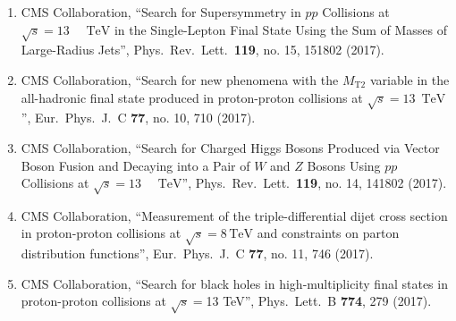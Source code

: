 \begin{enumerate}
\item CMS Collaboration, ``Search for Supersymmetry in $pp$ Collisions at $\sqrt{s}=13\text{ }\text{ }\mathrm{TeV}$ in the Single-Lepton Final State Using the Sum of Masses of Large-Radius Jets'', Phys.\ Rev.\ Lett.\  {\bf 119}, no. 15, 151802 (2017).

\item CMS Collaboration, ``Search for new phenomena with the $M_{\mathrm {T2}}$ variable in the all-hadronic final state produced in proton-proton collisions at $\sqrt{s} = 13$ $\,\text {TeV}$'', Eur.\ Phys.\ J.\ C {\bf 77}, no. 10, 710 (2017).

\item CMS Collaboration, ``Search for Charged Higgs Bosons Produced via Vector Boson Fusion and Decaying into a Pair of $W$ and $Z$ Bosons Using $pp$ Collisions at $\sqrt{s}=13\text{ }\text{ }\mathrm{TeV}$'', Phys.\ Rev.\ Lett.\  {\bf 119}, no. 14, 141802 (2017).

\item CMS Collaboration, ``Measurement of the triple-differential dijet cross section in proton-proton collisions at $\sqrt{s}=8\,\text {TeV} $ and constraints on parton distribution functions'', Eur.\ Phys.\ J.\ C {\bf 77}, no. 11, 746 (2017).

\item CMS Collaboration, ``Search for black holes in high-multiplicity final states in proton-proton collisions at $ \sqrt{s}=$13 TeV'', Phys.\ Lett.\ B {\bf 774}, 279 (2017).


\end{enumerate}
